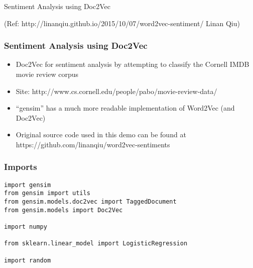 \begin{frame}[fragile]\frametitle{}

\begin{center}
{\Large Sentiment Analysis using Doc2Vec}

{\tiny (Ref: http://linanqiu.github.io/2015/10/07/word2vec-sentiment/ Linan Qiu) }
\end{center}

\end{frame}
\begin{frame}[fragile]\frametitle{Sentiment Analysis using Doc2Vec}
\begin{itemize}
\item Doc2Vec for sentiment analysis by attempting to classify the Cornell IMDB movie review corpus 
\item Site: http://www.cs.cornell.edu/people/pabo/movie-review-data/
\item ``gensim'' has a much more readable implementation of Word2Vec (and Doc2Vec)
\item Original source code used in this demo can be found at https://github.com/linanqiu/word2vec-sentiments
\end{itemize}
\end{frame}

\begin{frame}[fragile]\frametitle{Imports}
\begin{lstlisting}
import gensim
from gensim import utils
from gensim.models.doc2vec import TaggedDocument
from gensim.models import Doc2Vec

import numpy

from sklearn.linear_model import LogisticRegression

import random
\end{lstlisting}
\end{frame}


